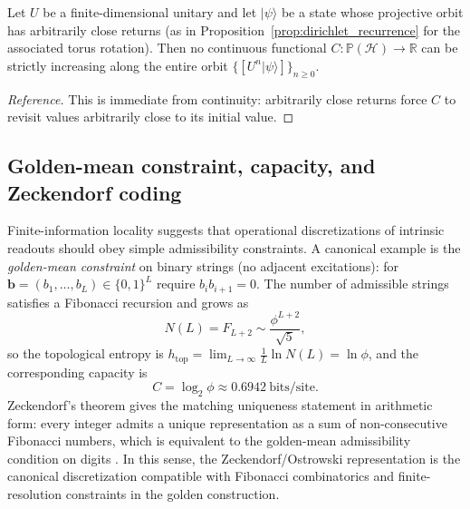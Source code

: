 \begin{corollary}
\label{cor:recurrence_no_monotone}
Let $U$ be a finite-dimensional unitary and let $|\psi\rangle$ be a state whose projective orbit has arbitrarily close returns (as in Proposition~\ref{prop:dirichlet_recurrence} for the associated torus rotation). Then no continuous functional $C:\mathbb{P}(\mathcal{H})\to\mathbb{R}$ can be strictly increasing along the entire orbit $\{[U^n|\psi\rangle]\}_{n\ge 0}$.
\end{corollary}
\begin{proof}[Reference]
This is immediate from continuity: arbitrarily close returns force $C$ to revisit values arbitrarily close to its initial value.
\end{proof}

\subsection{Golden-mean constraint, capacity, and Zeckendorf coding}
\label{app:golden_mean_capacity}
Finite-information locality suggests that operational discretizations of intrinsic readouts should obey simple admissibility constraints. A canonical example is the \emph{golden-mean constraint} on binary strings (no adjacent excitations): for $\mathbf{b}=(b_1,\dots,b_L)\in\{0,1\}^L$ require $b_i b_{i+1}=0$. The number of admissible strings satisfies a Fibonacci recursion and grows as
\begin{equation}
    N(L)=F_{L+2}\sim \frac{\phi^{L+2}}{\sqrt{5}},
\end{equation}
so the topological entropy is $h_{\mathrm{top}}=\lim_{L\to\infty}\frac{1}{L}\ln N(L)=\ln\phi$, and the corresponding capacity is
\begin{equation}
    C=\log_2\phi \approx 0.6942\ \text{bits/site}.
\end{equation}
Zeckendorf's theorem gives the matching uniqueness statement in arithmetic form: every integer admits a unique representation as a sum of non-consecutive Fibonacci numbers, which is equivalent to the golden-mean admissibility condition on digits \cite{Zeckendorf1972,AlloucheShallit2003}. In this sense, the Zeckendorf/Ostrowski representation is the canonical discretization compatible with Fibonacci combinatorics and finite-resolution constraints in the golden construction.


